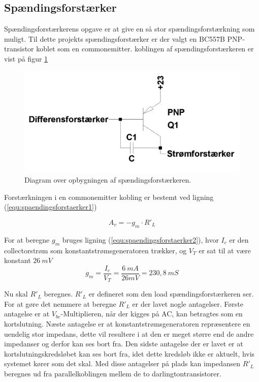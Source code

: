 \subsection{Spændingsforstærker}
\label{effekt_spaendingsforstaerker}
Spændingsforstærkerens opgave er at give en så stor spændingsforstærkning som muligt. Til dette projekts spændingsforstærker er der valgt en BC557B PNP-transistor koblet som en commonemitter. koblingen af spændingsforstærkeren er vist på figur \ref{spaendingsforstaerker_diagram}

\begin{figure}[h]
\centering
\includegraphics[scale=0.2]{teknisk/effektforstaerker/spaendingsforstaerker_diagram.png}
\caption{Diagram over opbygningen af spændingsforstærkeren.}
\label{spaendingsforstaerker_diagram}
\end{figure}

Forstærkningen i en commonemitter kobling er bestemt ved ligning (\ref{equ:spaendingsforstaerker1}) \cite{ael-mm7}%

\begin{equation}
\label{equ:spaendingsforstaerker1}
A_v = -g_m \cdot R'_L
\end{equation}

For at beregne $g_m$ bruges ligning (\ref{equ:spaendingsforstaerker2}), hvor $I_c$ er den collectorstrøm som konstantstrømsgeneratoren trækker, og $V_T$ er sat til at være konstant $26~mV$
\begin{equation}
\label{equ:spaendingsforstaerker2}
g_m = \frac{I_c}{V_T} = \frac{6~mA}{26mV} = 230,8~mS
\end{equation}

Nu skal $R'_L$ beregnes. $R'_L$ er defineret som den load spændingsforstærkeren ser. For at gøre det nemmere at beregne $R'_L$ er der lavet nogle antagelser. Første antagelse er at $V_{be}$-Multiplieren, når der kigges på AC, kan betragtes som en kortslutning. Næste antagelse er at konstantstrømsgeneratoren repræsentere en uendelig stor impedans, dette vil resultere i at den er meget større end de andre impedanser og derfor kan ses bort fra. Den sidste antagelse der er lavet er at kortslutningskredsløbet kan ses bort fra, idet dette kredsløb ikke er aktuelt, hvis systemet  kører som det skal. Med disse antagelser på plads kan impedansen $R'_L$ beregnes ud fra parallelkoblingen mellem de to darlingtontransistorer.

